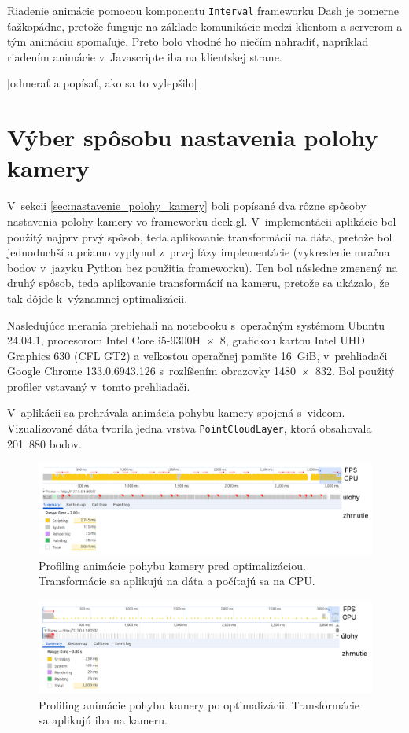 Riadenie animácie pomocou komponentu \texttt{Interval} frameworku Dash je pomerne ťažkopádne, pretože funguje na základe komunikácie medzi klientom a serverom a tým animáciu spomaľuje. Preto bolo vhodné ho niečím nahradiť, napríklad riadením animácie v~Javascripte iba na klientskej strane.

[odmerať a popísať, ako sa to vylepšilo]

\section{Výber spôsobu nastavenia polohy kamery}

V~sekcii \ref{sec:nastavenie_polohy_kamery} boli popísané dva rôzne spôsoby nastavenia polohy kamery vo frameworku deck.gl. V~implementácii aplikácie bol použitý najprv prvý spôsob, teda aplikovanie transformácií na dáta, pretože bol jednoduchší a priamo vyplynul z~prvej fázy implementácie (vykreslenie mračna bodov v~jazyku Python bez použitia frameworku). Ten bol následne zmenený na druhý spôsob, teda aplikovanie transformácií na kameru, pretože sa ukázalo, že tak dôjde k~významnej optimalizácii.

Nasledujúce merania prebiehali na notebooku s~operačným systémom Ubuntu 24.04.1, procesorom Intel Core i5-9300H~×~8, grafickou kartou Intel UHD Graphics 630 (CFL GT2) a veľkosťou operačnej pamäte 16~GiB, v~prehliadači Google Chrome 133.0.6943.126 s~rozlíšením obrazovky 1480~×~832. Bol použitý profiler vstavaný v~tomto prehliadači.

V~aplikácii sa prehrávala animácia pohybu kamery spojená s~videom. Vizualizované dáta tvorila jedna vrstva \texttt{PointCloudLayer}, ktorá obsahovala 201~880 bodov.

\begin{figure}[h!]
    \centering
    \includegraphics[width=1\linewidth]{text_prace/obrazky-figures/profiling1.pdf}
    \caption{Profiling animácie pohybu kamery pred optimalizáciou. Transformácie sa aplikujú na dáta a počítajú sa na CPU.}
    \label{fig:profiling1}
\end{figure}

\begin{figure}[h!]
    \centering
    \includegraphics[width=1\linewidth]{text_prace/obrazky-figures/profiling2.pdf}
    \caption{Profiling animácie pohybu kamery po optimalizácii. Transformácie sa aplikujú iba na kameru.}
    \label{fig:profiling2}
\end{figure}

